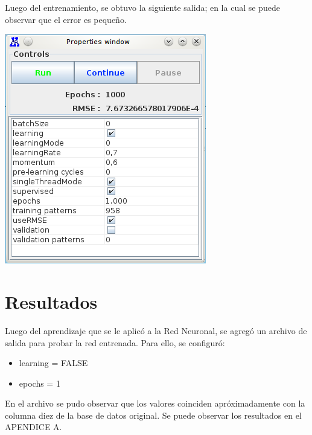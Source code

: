 \documentclass[12pt,titlepage]{article}
\begin{document}
Luego del entrenamiento, se obtuvo la siguiente salida; en la cual se puede observar que el error es peque\~no.
\begin{center}
 \includegraphics{./Images/fin-corridas.png}
\end{center}

\section{Resultados}
Luego del aprendizaje que se le aplic\'o a la Red Neuronal, se agreg\'o un archivo de salida para probar la red entrenada. Para ello, se configur\'o: 
\begin{itemize}
 \item learning = FALSE
 \item epochs = 1
\end{itemize}
En el archivo se pudo observar que los valores coinciden apr\'oximadamente con la columna diez de la base de datos original. Se puede observar los resultados en el APENDICE A.
\end{document}

